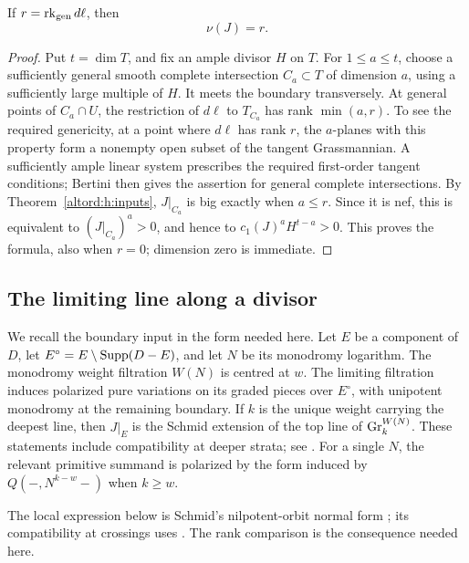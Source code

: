 \begin{proposition}\label{altord:h:numerical-rank}
If $r=\operatorname{rk}_{\mathrm{gen}}d\ell$, then
\begin{equation}\label{altord:h:eq-numerical-rank}
 \nu(J)=r.
\end{equation}
\end{proposition}

\begin{proof}
Put $t=\dim T$, and fix an ample divisor $H$ on $T$.
For $1\le a\le t$, choose a sufficiently general smooth complete
intersection $C_a\subset T$ of dimension $a$, using a sufficiently
large multiple of $H$. It meets the boundary transversely. At general
points of $C_a\cap U$, the restriction of $d\ell$ to $T_{C_a}$ has
rank $\min(a,r)$. To see the required genericity, at a point where
$d\ell$ has rank $r$, the $a$-planes with this property form a nonempty
open subset of the tangent Grassmannian. A sufficiently ample linear
system prescribes the required first-order tangent conditions; Bertini
then gives the assertion for general complete intersections.
By Theorem~\ref{altord:h:inputs}, $J|_{C_a}$ is big exactly when $a\le r$.
Since it is nef, this is equivalent to
$(J|_{C_a})^a>0$, and hence to $c_1(J)^aH^{t-a}>0$.
This proves the formula, also when $r=0$; dimension zero is immediate.
\end{proof}

\subsection{The limiting line along a divisor}

We recall the boundary input in the form needed here. Let $E$ be a
component of $D$, let
$E^\circ=E\setminus\operatorname{Supp}(D-E)$, and let $N$ be its monodromy logarithm.
The monodromy weight filtration $W(N)$ is centred at $w$.
The limiting filtration induces polarized pure variations on its graded
pieces over $E^\circ$, with unipotent monodromy at the remaining boundary.
If $k$ is the unique weight carrying the deepest line, then $J|_E$ is
the Schmid extension of the top line of $\operatorname{Gr}^{W(N)}_k$.
These statements include compatibility at deeper strata;
see \cite[\S2.5.2--\S2.5.3 and Lemma~2.16(3)]{BFMT}.
For a single $N$, the relevant primitive summand is polarized by the
form induced by $Q(-,N^{k-w}-)$ when $k\ge w$.

The local expression below is Schmid's nilpotent-orbit normal form
\cite[Theorem~4.12]{Schmid}; its compatibility at crossings uses
\cite{CKS}. The rank comparison is the consequence needed here.

